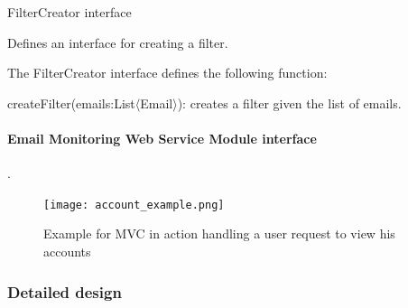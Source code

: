 \begin{my_itemize}
  \item FilterCreator interface
  \begin{my_desc}
   \item[Purpose] Defines an interface for creating a filter.
   \item[Function] The FilterCreator interface defines the following function:
	\begin{my_itemize}
	\item createFilter(emails:List$\langle$Email$\rangle$): creates a filter given the list of emails.
	\end{my_itemize}
  \end{my_desc}

\end{my_itemize}

\newpage
\paragraph{Email Monitoring Web Service Module interface}
.\\
\begin{figure}[H]
  \centering
  \texttt{[image: account\_example.png]}
  \caption[Example for MVC in action handling a user request to view his 
  accounts]{Example for MVC in action handling a user request to view his accounts}
\end{figure}

\newpage
\subsubsection{Detailed design}
